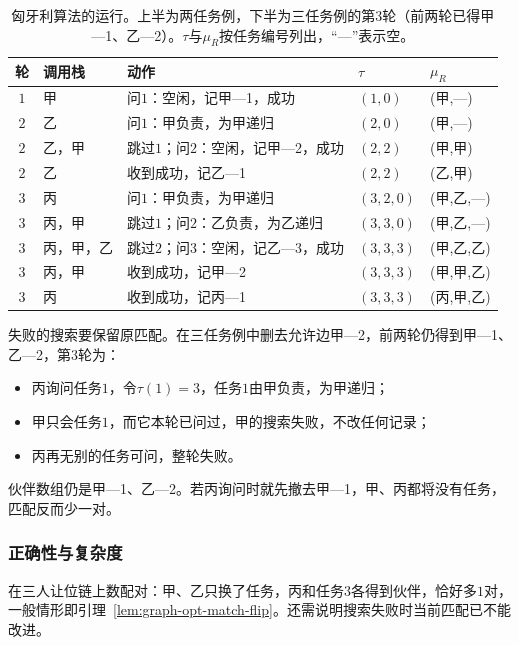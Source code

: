 \begin{table}[!htb]
  \centering\small
  \caption{匈牙利算法的运行。上半为两任务例，下半为三任务例的第$3$轮（前两轮已得甲—1、乙—2）。$\tau$与$\mu_R$按任务编号列出，“—”表示空。}
  \label{tab:graph-opt-match-trace}
  \begin{tabular}{@{}cllll@{}}
    \toprule
    轮 & 调用栈 & 动作 & $\tau$ & $\mu_R$ \\
    \midrule
    $1$ & 甲 & 问$1$：空闲，记甲—1，成功 & $(1,0)$ & (甲,—) \\
    $2$ & 乙 & 问$1$：甲负责，为甲递归 & $(2,0)$ & (甲,—) \\
    $2$ & 乙，甲 & 跳过$1$；问$2$：空闲，记甲—2，成功 & $(2,2)$ & (甲,甲) \\
    $2$ & 乙 & 收到成功，记乙—1 & $(2,2)$ & (乙,甲) \\
    \midrule
    $3$ & 丙 & 问$1$：甲负责，为甲递归 & $(3,2,0)$ & (甲,乙,—) \\
    $3$ & 丙，甲 & 跳过$1$；问$2$：乙负责，为乙递归 & $(3,3,0)$ & (甲,乙,—) \\
    $3$ & 丙，甲，乙 & 跳过$2$；问$3$：空闲，记乙—3，成功 & $(3,3,3)$ & (甲,乙,乙) \\
    $3$ & 丙，甲 & 收到成功，记甲—2 & $(3,3,3)$ & (甲,甲,乙) \\
    $3$ & 丙 & 收到成功，记丙—1 & $(3,3,3)$ & (丙,甲,乙) \\
    \bottomrule
  \end{tabular}
\end{table}

失败的搜索要保留原匹配。在三任务例中删去允许边甲—2，前两轮仍得到甲—1、乙—2，第$3$轮为：
\begin{itemize}
  \item 丙询问任务$1$，令$\tau(1)=3$，任务$1$由甲负责，为甲递归；
  \item 甲只会任务$1$，而它本轮已问过，甲的搜索失败，不改任何记录；
  \item 丙再无别的任务可问，整轮失败。
\end{itemize}
伙伴数组仍是甲—1、乙—2。若丙询问时就先撤去甲—1，甲、丙都将没有任务，匹配反而少一对。

\subsubsection{正确性与复杂度}

在三人让位链上数配对：甲、乙只换了任务，丙和任务$3$各得到伙伴，恰好多$1$对，一般情形即引理~\ref{lem:graph-opt-match-flip}。还需说明搜索失败时当前匹配已不能改进。

